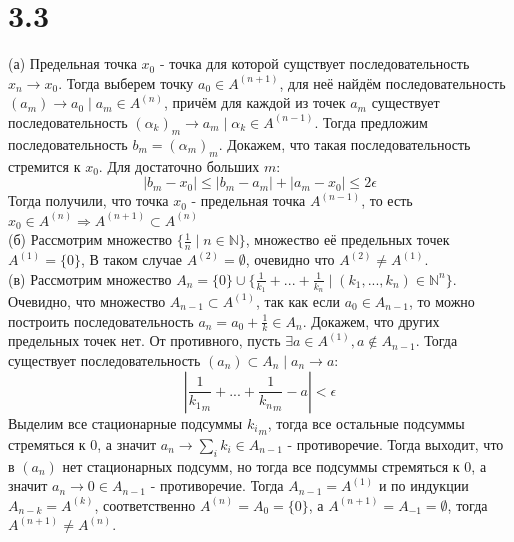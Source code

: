 \documentclass[12pt]{article}
\begin{document}
\section{3.3}
(а) Предельная точка $x_0$ - точка для которой сущствует последовательность $x_n \to x_0$.
Тогда выберем точку $a_0 \in A^{(n + 1)}$, для неё найдём последовательность $(a_m) \to a_0 \mid a_m \in A^{(n)}$, причём для каждой из точек $a_m$
существует последовательность $(\alpha_k)_m \to a_m \mid \alpha_k \in A^{(n-1)}$. Тогда предложим последовательность $b_m = (\alpha_m)_m$. Докажем, что 
такая последовательность стремится к $x_0$. Для достаточно больших $m$:
$$
|b_m - x_0| \leq |b_m - a_m| + |a_m - x_0| \leq 2\epsilon
$$
Тогда получили, что точка $x_0$ - предельная точка $A^{(n-1)}$, то есть $x_0 \in A^{(n)} \Rightarrow A^{(n + 1)} \subset A^{(n)}$
\\(б) Рассмотрим множество $\{\frac{1}{n} \mid n \in \mathbb{N}\}$, множество её предельных точек $A^{(1)} = \{0\}$, В таком случае 
$A^{(2)} = \emptyset$, очевидно что $A^{(2)} \not = A^{(1)}$.
\\(в) Рассмотрим множество $A_n = \{0\} \cup \{\frac{1}{k_1} + ... + \frac{1}{k_n} \mid (k_1, ..., k_n) \in \mathbb{N}^n\}$. 
Очевидно, что множество $A_{n - 1} \subset A^{(1)}$, так как если $a_0 \in A_{n-1}$, то можно построить последовательность $a_n = a_0 + \frac{1}{k} \in A_n$.
Докажем, что других предельных точек нет. От противного, пусть $\exists a \in A^{(1)}, a \not \in A_{n - 1}$. Тогда существует последовательность 
$(a_n) \subset A_n \mid a_n \to a$:
$$
|\frac{1}{{k_1}_m} + ... + \frac{1}{{k_n}_m} - a| < \epsilon
$$
Выделим все стационарные подсуммы ${k_i}_m$, тогда все остальные подсуммы стремяться к $0$, а значит $a_n \to \sum_{i}{{k_i}} \in A_{n-1}$ - противоречие.
Тогда выходит, что в $(a_n)$ нет стационарных подсумм, но тогда все подсуммы стремяться к $0$, а значит $a_n \to 0 \in A_{n-1}$ - противоречие.
Тогда $A_{n-1} = A^{(1)}$ и по индукции $A_{n-k} = A^{(k)}$, соответственно $A^{(n)} = A_{0} = \{0\}$, а
$A^{(n + 1)} = A_{-1} = \emptyset$, тогда $A^{(n + 1)} \not = A^{(n)}$.
\end{document}
